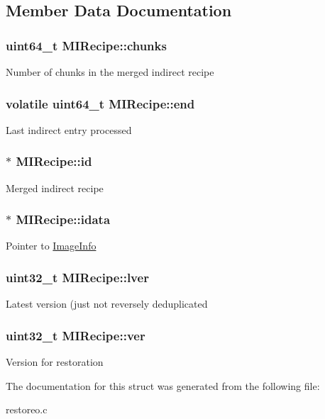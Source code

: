 \subsection{\-Member \-Data \-Documentation}
\hypertarget{structMIRecipe_a63a2515abe1efe6c2aa210929f70cd7d}{
\subsubsection[{chunks}]{\setlength{\rightskip}{0pt plus 5cm}uint64\-\_\-t {\bf \-M\-I\-Recipe\-::chunks}}}\label{structMIRecipe_a63a2515abe1efe6c2aa210929f70cd7d}
\-Number of chunks in the merged indirect recipe \hypertarget{structMIRecipe_ad3dfe2624c87fd6211cc777c064f4b94}{
\subsubsection[{end}]{\setlength{\rightskip}{0pt plus 5cm}volatile uint64\-\_\-t {\bf \-M\-I\-Recipe\-::end}}}\label{structMIRecipe_ad3dfe2624c87fd6211cc777c064f4b94}
\-Last indirect entry processed \hypertarget{structMIRecipe_afe805781e4f337606cc355cdf8caf98d}{
\subsubsection[{id}]{$\ast$ {\bf \-M\-I\-Recipe\-::id}}}\label{structMIRecipe_afe805781e4f337606cc355cdf8caf98d}
\-Merged indirect recipe \hypertarget{structMIRecipe_a57c566e7e9c4b3e0f4001712a57ef280}{
\subsubsection[{idata}]{$\ast$ {\bf \-M\-I\-Recipe\-::idata}}}\label{structMIRecipe_a57c566e7e9c4b3e0f4001712a57ef280}
\-Pointer to \hyperlink{structImageInfo}{\-Image\-Info} \hypertarget{structMIRecipe_a1bce899fd90f5b324e5dfa3f18039c1f}{
\subsubsection[{lver}]{\setlength{\rightskip}{0pt plus 5cm}uint32\-\_\-t {\bf \-M\-I\-Recipe\-::lver}}}\label{structMIRecipe_a1bce899fd90f5b324e5dfa3f18039c1f}
\-Latest version (just not reversely deduplicated \hypertarget{structMIRecipe_abcf9aa1e0106d8594ed734412df447b1}{
\subsubsection[{ver}]{\setlength{\rightskip}{0pt plus 5cm}uint32\-\_\-t {\bf \-M\-I\-Recipe\-::ver}}}\label{structMIRecipe_abcf9aa1e0106d8594ed734412df447b1}
\-Version for restoration 

\-The documentation for this struct was generated from the following file\-:\begin{DoxyCompactItemize}
\item 
restoreo.\-c\end{DoxyCompactItemize}
